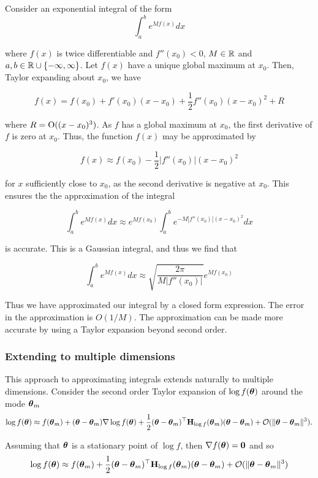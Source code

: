Consider an exponential integral of the form
\[
	\int_a^b e^{M f(x)} dx
\]

\noindent where $f(x)$ is twice differentiable and $f''(x_0) < 0$, $M \in {\mathbb{R}}$ and $a, b \in {\mathbb{R}} \cup \{-\infty,
\infty\}$. Let $f(x)$ have a unique global maximum at $x_0$. Then, Taylor expanding about $x_0$, we have

\[
	f(x) = f(x_0) + f'(x_0) (x - x_0) + \frac{1}{2} f''(x_0) (x - x_0)^2 + R
\]

\noindent where $R = \text{O}((x - x_0)^3)$. As $f$ has a global maximum at $x_0$, the first derivative of $f$ is
zero at $x_0$. Thus, the function $f(x)$ may be approximated by

\[
	f(x) \approx f(x_0) - \frac{1}{2} |f''(x_0)| (x - x_0)^2
\]

\noindent for $x$ sufficiently close to $x_0$, as the second derivative is negative at $x_0$. This ensures the
the approximation of the integral

\[
	\int_a^b e^{M f(x)} dx \approx e^{M f(x_0)} \int_a^b e^{-M |f''(x_0)|(x - x_0)^2} dx
\]

\noindent is accurate. This is a Gaussian integral, and thus we find that

\[
	\int_a^b e^{M f(x)} dx \approx \sqrt{\frac{2 \pi}{M |f''(x_0)|}} e^{M f(x_0)}
\]

\noindent Thus we have approximated our integral by a closed form expression. The error in the approximation
is $O(1/M)$. The approximation can be made more accurate by using a Taylor expansion beyond second order.

\subsubsection{Extending to multiple dimensions}
This approach to approximating integrals extends naturally to multiple dimensions.
Consider the second order Taylor expansion of $\log f({\boldsymbol \theta})$ around the mode ${\boldsymbol \theta}_m$
$$
\log f({\boldsymbol \theta}) \approx f({\boldsymbol \theta}_m) + ({\boldsymbol \theta} - {\boldsymbol \theta}_m) \nabla \log f({\boldsymbol \theta}) + \frac{1}{2} ({\boldsymbol \theta} - {\boldsymbol \theta}_m)^\top {\bf H}_{\log f}({\boldsymbol \theta}_m) ({\boldsymbol \theta} - {\boldsymbol \theta}_m) + {\mathcal O}(\|{\boldsymbol \theta} - {\boldsymbol \theta}_m\|^3).
$$

\noindent Assuming that ${\boldsymbol \theta}$ is a stationary point of $\log f$, then $\nabla f({\boldsymbol \theta}) = {\bf 0}$ and so
$$
\log f({\boldsymbol \theta}) \approx f({\boldsymbol \theta}_m) + \frac{1}{2} ({\boldsymbol \theta} - {\boldsymbol \theta}_m)^\top {\bf H}_{\log f}({\boldsymbol \theta}_m) ({\boldsymbol \theta} - {\boldsymbol \theta}_m) + {\mathcal O}(\|{\boldsymbol \theta} - {\boldsymbol \theta}_m\|^3)
$$

